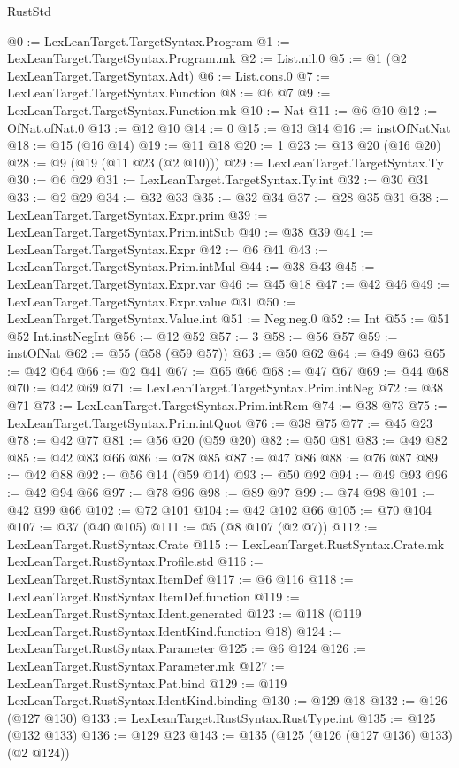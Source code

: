 \begin{lexlean}{RustStd}
\begin{coremodule}
{\begin{coremodule}
{{{{{@0 := LexLeanTarget.TargetSyntax.Program
@1 := LexLeanTarget.TargetSyntax.Program.mk
@2 := List.nil.{0}
@5 := @1 (@2 LexLeanTarget.TargetSyntax.Adt)
@6 := List.cons.{0}
@7 := LexLeanTarget.TargetSyntax.Function
@8 := @6 @7
@9 := LexLeanTarget.TargetSyntax.Function.mk
@10 := Nat
@11 := @6 @10
@12 := OfNat.ofNat.{0}
@13 := @12 @10
@14 := 0
@15 := @13 @14
@16 := instOfNatNat
@18 := @15 (@16 @14)
@19 := @11 @18
@20 := 1
@23 := @13 @20 (@16 @20)
@28 := @9 (@19 (@11 @23 (@2 @10)))
@29 := LexLeanTarget.TargetSyntax.Ty
@30 := @6 @29
@31 := LexLeanTarget.TargetSyntax.Ty.int
@32 := @30 @31
@33 := @2 @29
@34 := @32 @33
@35 := @32 @34
@37 := @28 @35 @31
@38 := LexLeanTarget.TargetSyntax.Expr.prim
@39 := LexLeanTarget.TargetSyntax.Prim.intSub
@40 := @38 @39
@41 := LexLeanTarget.TargetSyntax.Expr
@42 := @6 @41
@43 := LexLeanTarget.TargetSyntax.Prim.intMul
@44 := @38 @43
@45 := LexLeanTarget.TargetSyntax.Expr.var
@46 := @45 @18
@47 := @42 @46
@49 := LexLeanTarget.TargetSyntax.Expr.value @31
@50 := LexLeanTarget.TargetSyntax.Value.int
@51 := Neg.neg.{0}
@52 := Int
@55 := @51 @52 Int.instNegInt
@56 := @12 @52
@57 := 3
@58 := @56 @57
@59 := instOfNat
@62 := @55 (@58 (@59 @57))
@63 := @50 @62
@64 := @49 @63
@65 := @42 @64
@66 := @2 @41
@67 := @65 @66
@68 := @47 @67
@69 := @44 @68
@70 := @42 @69
@71 := LexLeanTarget.TargetSyntax.Prim.intNeg
@72 := @38 @71
@73 := LexLeanTarget.TargetSyntax.Prim.intRem
@74 := @38 @73
@75 := LexLeanTarget.TargetSyntax.Prim.intQuot
@76 := @38 @75
@77 := @45 @23
@78 := @42 @77
@81 := @56 @20 (@59 @20)
@82 := @50 @81
@83 := @49 @82
@85 := @42 @83 @66
@86 := @78 @85
@87 := @47 @86
@88 := @76 @87
@89 := @42 @88
@92 := @56 @14 (@59 @14)
@93 := @50 @92
@94 := @49 @93
@96 := @42 @94 @66
@97 := @78 @96
@98 := @89 @97
@99 := @74 @98
@101 := @42 @99 @66
@102 := @72 @101
@104 := @42 @102 @66
@105 := @70 @104
@107 := @37 (@40 @105)
@111 := @5 (@8 @107 (@2 @7))
@112 := LexLeanTarget.RustSyntax.Crate
@115 := LexLeanTarget.RustSyntax.Crate.mk LexLeanTarget.RustSyntax.Profile.std
@116 := LexLeanTarget.RustSyntax.ItemDef
@117 := @6 @116
@118 := LexLeanTarget.RustSyntax.ItemDef.function
@119 := LexLeanTarget.RustSyntax.Ident.generated
@123 := @118 (@119 LexLeanTarget.RustSyntax.IdentKind.function @18)
@124 := LexLeanTarget.RustSyntax.Parameter
@125 := @6 @124
@126 := LexLeanTarget.RustSyntax.Parameter.mk
@127 := LexLeanTarget.RustSyntax.Pat.bind
@129 := @119 LexLeanTarget.RustSyntax.IdentKind.binding
@130 := @129 @18
@132 := @126 (@127 @130)
@133 := LexLeanTarget.RustSyntax.RustType.int
@135 := @125 (@132 @133)
@136 := @129 @23
@143 := @135 (@125 (@126 (@127 @136) @133) (@2 @124))
}}}}}
\end{coremodule}}
\end{coremodule}
\end{lexlean}
